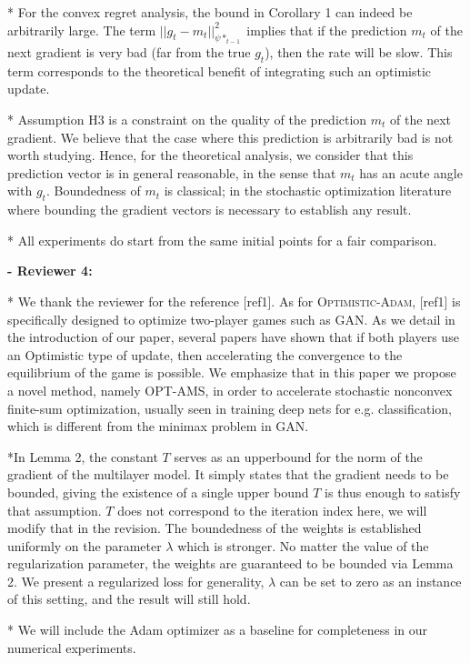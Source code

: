 \documentclass{article}
\begin{document}
* For the convex regret analysis, the bound in Corollary 1 can indeed be arbitrarily large. The term $||g_t  - m_t ||_{\psi*_{t-1}}^2$ implies that if the prediction $m_t$ of the next gradient is very bad (far from the true $g_t$), then the rate will be slow. This term corresponds to the theoretical benefit of integrating such an optimistic update.

* Assumption H3 is a constraint on the quality of the prediction $m_t$ of the next gradient. 
We believe that the case where this prediction is arbitrarily bad is not worth studying. 
Hence, for the theoretical analysis, we consider that this prediction vector is in general reasonable, in the sense that $m_t$ has an acute angle with $g_t$. 
Boundedness of $m_t$ is classical; in the stochastic optimization literature where bounding the gradient vectors is necessary to establish any result.

* All experiments do start from the same initial points for a fair comparison. 

\textbf{- Reviewer 4:}

* We thank the reviewer for the reference [ref1].
As for \textsc{Optimistic-Adam}, [ref1] is specifically designed to optimize two-player games such as GAN. 
As we detail in the introduction of our paper, several papers have shown that if both players use an Optimistic type of update, then accelerating the convergence to the equilibrium of the game is possible.
We emphasize that in this paper we propose a novel method, namely OPT-AMS, in order to accelerate stochastic nonconvex finite-sum optimization, usually seen in training deep nets for e.g. classification, which is different from the minimax problem in GAN.

*In Lemma 2, the constant $T$ serves as an upperbound for the norm of the gradient of the multilayer model. It simply states that the gradient needs to be bounded, giving the existence of a single upper bound $T$ is thus enough to satisfy that assumption. $T$ does not correspond to the iteration index here, we will modify that in the revision.
The boundedness of the weights is established uniformly on the parameter $\lambda$ which is stronger. No matter the value of the regularization parameter, the weights are guaranteed to be bounded via Lemma 2. We present a regularized loss for generality, $\lambda$ can be set to zero as an instance of this setting, and the result will still hold.

* We will include the Adam optimizer as a baseline for completeness in our numerical experiments.
\end{document}
